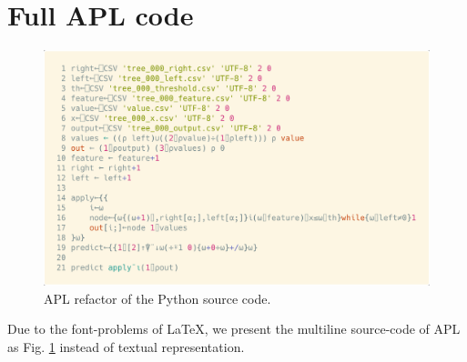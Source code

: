 \documentclass{IEEEtran}
\begin{document}
{\renewcommand*{\bibfont}{\small}\printbibliography}

\newpage

\appendix
\section{Full APL code}

\begin{figure}
  \centering
  \includegraphics[width=\columnwidth]{./assets/aplsrc.png}
  \caption{APL refactor of the Python source code.}
  \label{fig:aplsrc}
\end{figure}

Due to the font-problems of LaTeX, we present the multiline source-code of APL as Fig. \ref{fig:aplsrc} instead of textual representation.
\end{document}
